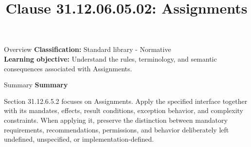 \documentclass[10pt,letterpaper]{article}
\title{Clause 31.12.06.05.02: Assignments}
\author{}
\date{}
\begin{document}
\maketitle
\begin{CornellOverviewBox}{Overview}
\textbf{Classification:} Standard library - Normative\\[2pt]
\textbf{Learning objective:} Understand the rules, terminology, and semantic consequences associated with Assignments.
\end{CornellOverviewBox}\begin{CornellSummaryBox}{Summary}
{\sffamily\bfseries\color{Accent} Summary}\par\vspace{3pt}Section 31.12.6.5.2 focuses on Assignments. Apply the specified interface together with its mandates, effects, result conditions, exception behavior, and complexity constraints. When applying it, preserve the distinction between mandatory requirements, recommendations, permissions, and behavior deliberately left undefined, unspecified, or implementation-defined.
\end{CornellSummaryBox}
\end{document}
